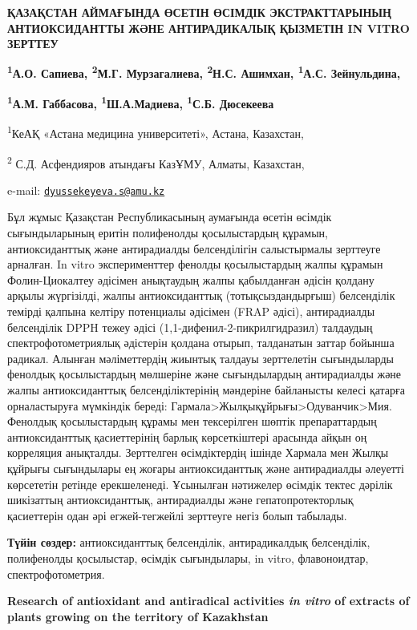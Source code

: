 {\bfseries ҚАЗАҚСТАН АЙМАҒЫНДА ӨСЕТІН ӨСІМДІК ЭКСТРАКТТАРЫНЫҢ
АНТИОКСИДАНТТЫ ЖӘНЕ АНТИРАДИКАЛЫҚ ҚЫЗМЕТІН IN VITRO ЗЕРТТЕУ}

{\bfseries \textsuperscript{1}А.О. Сапиева, \textsuperscript{2}М.Г.
Мурзагалиева, \textsuperscript{2}Н.С. Ашимхан, \textsuperscript{1}А.С.
Зейнульдина,}

{\bfseries \textsuperscript{1}А.М. Габбасова,
\textsuperscript{1}Ш.А.Мадиева, \textsuperscript{1}С.Б.
Дюсекеева}\textsuperscript{\envelope }

\textsuperscript{1}КеАҚ «Астана медицина университеті», Астана,
Казахстан,

\textsuperscript{2} С.Д. Асфендияров атындағы КазҰМУ, Алматы, Казахстан,

e-mail:
\href{mailto:dyussekeyeva.s@amu.kz}{\nolinkurl{dyussekeyeva.s@amu.kz}}

Бұл жұмыс Қазақстан Республикасының аумағында өсетін өсімдік
сығындыларының еритін полифенолды қосылыстардың құрамын, антиоксиданттық
және антирадиалды белсенділігін салыстырмалы зерттеуге арналған. In
vitro эксперименттер фенолды қосылыстардың жалпы құрамын Фолин-Циокалтеу
әдісімен анықтаудың жалпы қабылданған әдісін қолдану арқылы жүргізілді,
жалпы антиоксиданттық (тотықсыздандырғыш) белсенділік темірді қалпына
келтіру потенциалы әдісімен (FRAP әдісі), антирадиалды белсенділік DPPH
тежеу әдісі (1,1-дифенил-2-пикрилгидразил) талдаудың
спектрофотометриялық әдістерін қолдана отырып, талданатын заттар бойынша
радикал. Алынған мәліметтердің жиынтық талдауы зерттелетін сығындыларды
фенолдық қосылыстардың мөлшеріне және сығындылардың антирадиалды және
жалпы антиоксиданттық белсенділіктерінің мәндеріне байланысты келесі
қатарға орналастыруға мүмкіндік береді:
Гармала\textgreater Жылқықұйрығы\textgreater Одуванчик\textgreater Мия.
Фенолдық қосылыстардың құрамы мен тексерілген шөптік препараттардың
антиоксиданттық қасиеттерінің барлық көрсеткіштері арасында айқын оң
корреляция анықталды. Зерттелген өсімдіктердің ішінде Хармала мен Жылқы
құйрығы сығындылары ең жоғары антиоксиданттық және антирадиалды әлеуетті
көрсететін ретінде ерекшеленеді. Ұсынылған нәтижелер өсімдік тектес
дәрілік шикізаттың антиоксиданттық, антирадиалды және гепатопротекторлық
қасиеттерін одан әрі егжей-тегжейлі зерттеуге негіз болып табылады.

{\bfseries Түйін сөздер:} антиоксиданттық белсенділік, антирадикалдық
белсенділік, полифенолды қосылыстар, өсімдік сығындылары, in vitro,
флавоноидтар, спектрофотометрия.

{\bfseries Research of antioxidant and antiradical activities \emph{in
vitro} of extracts of plants growing on the territory of Kazakhstan}

